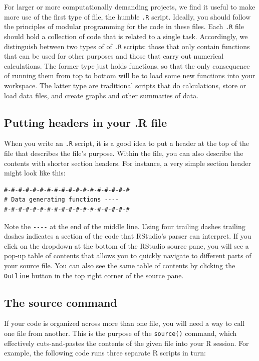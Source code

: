 \documentclass[
]{book}
\begin{document}
For larger or more computationally demanding projects, we find it useful to make more use of the first type of file, the humble \texttt{.R} script.
Ideally, you should follow the principles of modular programming for the code in these files.
Each \texttt{.R} file should hold a collection of code that is related to a single task.
Accordingly, we distinguish between two types of of \texttt{.R} scripts: those that only contain functions that can be used for other purposes and those that carry out numerical calculations.
The former type just holds functions, so that the only consequence of running them from top to bottom will be to load some new functions into your workspace.
The latter type are traditional scripts that do calculations, store or load data files, and create graphs and other summaries of data.

\subsection{Putting headers in your .R file}\label{putting-headers-in-your-.r-file}

When you write an \texttt{.R} script, it is a good idea to put a header at the top of the file that describes the file's purpose.
Within the file, you can also describe the contents with shorter section headers.
For instance, a very simple section header might look like this:

\begin{verbatim}
#-#-#-#-#-#-#-#-#-#-#-#-#-#-#-#-#-#
# Data generating functions ----
#-#-#-#-#-#-#-#-#-#-#-#-#-#-#-#-#-#
\end{verbatim}

Note the \texttt{-\/-\/-\/-} at the end of the middle line.
Using four trailing dashes trailing dashes indicates a section of the code that RStudio's parser can interpret.
If you click on the dropdown at the bottom of the RStudio source pane, you will see a pop-up table of contents that allows you to quickly navigate to different parts of your source file.
You can also see the same table of contents by clicking the \texttt{Outline} button in the top right corner of the source pane.

\subsection{The source command}\label{about-source-command}

If your code is organized across more than one file, you will need a way to call one file from another.
This is the purpose of the \texttt{source()} command, which effectively cuts-and-pastes the contents of the given file into your R session.
For example, the following code runs three separate R scripts in turn:
\end{document}
